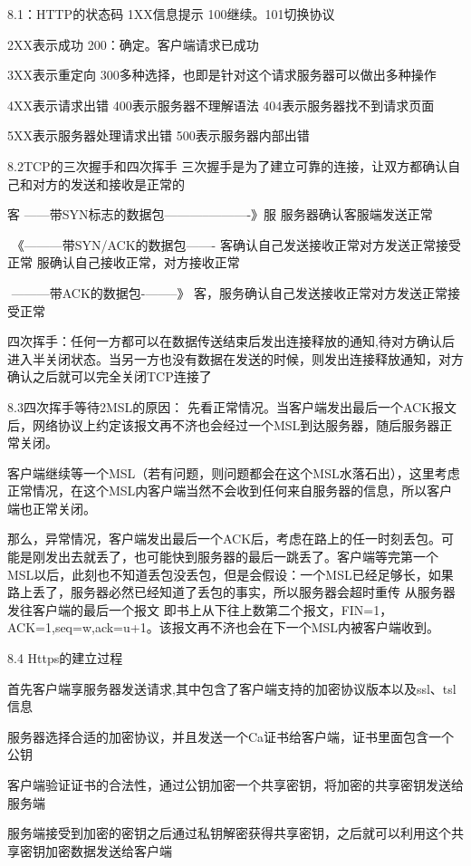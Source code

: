 \documentclass[UTF8]{ctexart}
\begin{document}
8.1：HTTP的状态码
1XX信息提示 100继续。101切换协议

2XX表示成功 200：确定。客户端请求已成功

3XX表示重定向 300多种选择，也即是针对这个请求服务器可以做出多种操作

4XX表示请求出错 400表示服务器不理解语法 404表示服务器找不到请求页面

5XX表示服务器处理请求出错 500表示服务器内部出错

8.2TCP的三次握手和四次挥手
三次握手是为了建立可靠的连接，让双方都确认自己和对方的发送和接收是正常的

客 ---—带SYN标志的数据包—--------———-》服 服务器确认客服端发送正常

​ 《---------带SYN/ACK的数据包------- 客确认自己发送接收正常对方发送正常接受正常 服确认自己接收正常，对方接收正常

​ —------带ACK的数据包-—-----》 客，服务确认自己发送接收正常对方发送正常接受正常

四次挥手：任何一方都可以在数据传送结束后发出连接释放的通知,待对方确认后进入半关闭状态。当另一方也没有数据在发送的时候，则发出连接释放通知，对方确认之后就可以完全关闭TCP连接了

8.3四次挥手等待2MSL的原因：
先看正常情况。当客户端发出最后一个ACK报文后，网络协议上约定该报文再不济也会经过一个MSL到达服务器，随后服务器正常关闭。

客户端继续等一个MSL（若有问题，则问题都会在这个MSL水落石出），这里考虑正常情况，在这个MSL内客户端当然不会收到任何来自服务器的信息，所以客户端也正常关闭。

那么，异常情况，客户端发出最后一个ACK后，考虑在路上的任一时刻丢包。可能是刚发出去就丢了，也可能快到服务器的最后一跳丢了。客户端等完第一个MSL以后，此刻也不知道丢包没丢包，但是会假设：一个MSL已经足够长，如果路上丢了，服务器必然已经知道了丢包的事实，所以服务器会超时重传 从服务器发往客户端的最后一个报文 即书上从下往上数第二个报文，FIN=1，ACK=1,seq=w,ack=u+1。该报文再不济也会在下一个MSL内被客户端收到。

8.4 Https的建立过程


首先客户端享服务器发送请求,其中包含了客户端支持的加密协议版本以及ssl、tsl信息

服务器选择合适的加密协议，并且发送一个Ca证书给客户端，证书里面包含一个公钥

客户端验证证书的合法性，通过公钥加密一个共享密钥，将加密的共享密钥发送给服务端

服务端接受到加密的密钥之后通过私钥解密获得共享密钥，之后就可以利用这个共享密钥加密数据发送给客户端
\end{document}
